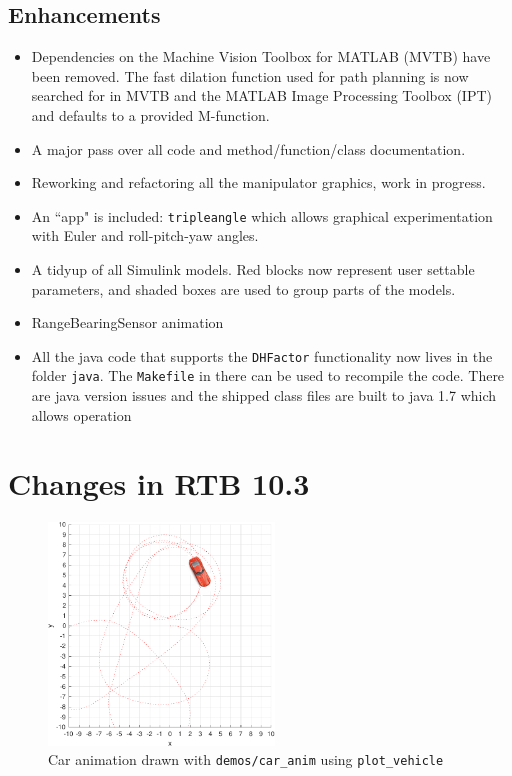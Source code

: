\documentclass[a4paper,twoside]{report}
\begin{document}
\subsection{Enhancements}
\begin{itemize}
\item Dependencies on the Machine Vision Toolbox for MATLAB (MVTB) have been removed.  The fast dilation function used for path planning is now searched for in MVTB and the MATLAB Image Processing Toolbox (IPT) and defaults to a provided M-function.
\item A major pass over all code and method/function/class documentation.
\item Reworking and refactoring all the manipulator graphics, work in progress.
\item An ``app" is included: \texttt{tripleangle} which allows graphical experimentation with Euler and roll-pitch-yaw angles.
\item A tidyup of all Simulink models.  Red blocks now represent user settable parameters, and shaded boxes are used to group parts of the models.
\item RangeBearingSensor animation
\item All the java code that supports the \texttt{DHFactor} functionality now lives in the folder \texttt{java}.  The \texttt{Makefile} in there can be used
to recompile the code.  There are java version issues and the shipped class files are built to java 1.7 which allows operation
\end{itemize}

\section{Changes in RTB 10.3}
\begin{figure}[b]
\centering
\includegraphics[width=6cm]{figs/caranim.pdf} 
\caption{Car animation drawn with \texttt{demos/car\_anim} using \texttt{plot\_vehicle}}\label{fig:caranim}
\end{figure}
\end{document}
